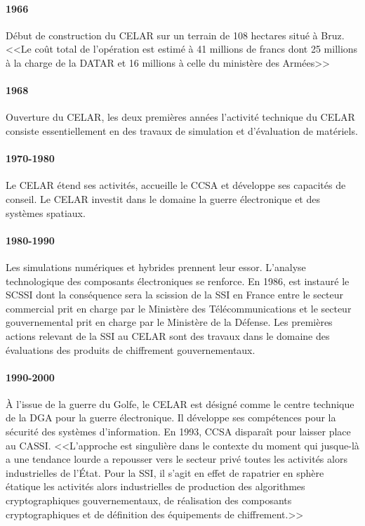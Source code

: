 \documentclass[11pt, book, english, french, standardlists]{upmethodology-document}
\begin{document}
				\paragraph*{1966}
					Début de construction du \gls{CELAR} sur un terrain de 108 hectares situé à Bruz. <<Le coût total de l'opération est estimé à 41 millions de francs dont 25 millions à la charge de la \gls{DATAR} et 16 millions à celle du ministère des Armées>>\cite{CELAR40ansAvenir}
				\paragraph*{1968}
					Ouverture du \gls{CELAR}, les deux premières années l'activité technique du \gls{CELAR} consiste essentiellement en des travaux de simulation et d'évaluation de matériels.
				\paragraph*{1970-1980}
					Le \gls{CELAR} étend ses activités, accueille le \gls{CCSA} et développe ses capacités de conseil. Le \gls{CELAR} investit dans le domaine la guerre électronique et des systèmes spatiaux.
				\paragraph*{1980-1990}
					Les simulations numériques et hybrides prennent leur essor. L'analyse technologique des composants électroniques se renforce. En 1986, est instauré le \gls{SCSSI}\cite{DecretCreationSCSSI} dont la conséquence sera la scission de la \gls{SSI} en France entre le secteur commercial prit en charge par le Ministère des Télécommunications et le secteur gouvernemental prit en charge par le Ministère de la Défense. Les premières actions relevant de la \gls{SSI} au \gls{CELAR} sont des travaux dans le domaine des évaluations des produits de chiffrement gouvernementaux.
				\paragraph*{1990-2000}
					À l'issue de la guerre du Golfe, le \gls{CELAR} est désigné comme le centre technique de la \gls{DGA} pour la guerre électronique. Il développe ses compétences pour la sécurité des systèmes d'information. En 1993, \gls{CCSA} disparaît pour laisser place au \gls{CASSI}. <<L'approche est singulière dans le contexte du moment qui jusque-là a une tendance lourde a repousser vers le secteur privé toutes les activités alors industrielles de l'État. Pour la \gls{SSI}, il s'agit en effet de rapatrier en sphère étatique les activités alors industrielles de production des algorithmes cryptographiques gouvernementaux, de réalisation des composants cryptographiques et de définition des équipements de chiffrement.>>\cite{CELAR40ansAvenir} %
\end{document}
